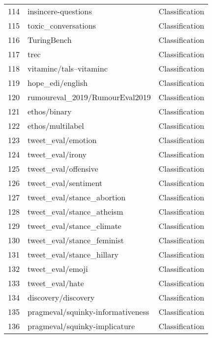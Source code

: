 \documentclass[11pt]{article}
\begin{document}
\begin{longtable}{lll}
114 & insincere-questions & Classification \\
115 & toxic\_conversations & Classification \\
116 & TuringBench \citep{huggingface:dataset} & Classification \\
117 & trec \citep{li-roth-2002-learning} & Classification \\
118 & vitaminc/tals--vitaminc \citep{schuster-etal-2021-get} & Classification \\
119 & hope\_edi/english \citep{chakravarthi-2020-hopeedi} & Classification \\
120 & rumoureval\_2019/RumourEval2019 \citep{gorrell-etal-2019-semeval} & Classification \\
121 & ethos/binary \citep{mollas2020ethos} & Classification \\
122 & ethos/multilabel \citep{mollas2020ethos} & Classification \\
123 & tweet\_eval/emotion \citep{barbieri2020tweeteval} & Classification \\
124 & tweet\_eval/irony \citep{barbieri2020tweeteval} & Classification \\
125 & tweet\_eval/offensive \citep{barbieri2020tweeteval} & Classification \\
126 & tweet\_eval/sentiment \citep{barbieri2020tweeteval} & Classification \\
127 & tweet\_eval/stance\_abortion \citep{barbieri2020tweeteval} & Classification \\
128 & tweet\_eval/stance\_atheism \citep{barbieri2020tweeteval} & Classification \\
129 & tweet\_eval/stance\_climate \citep{barbieri2020tweeteval} & Classification \\
130 & tweet\_eval/stance\_feminist \citep{barbieri2020tweeteval} & Classification \\
131 & tweet\_eval/stance\_hillary \citep{barbieri2020tweeteval} & Classification \\
132 & tweet\_eval/emoji \citep{barbieri2020tweeteval} & Classification \\
133 & tweet\_eval/hate \citep{barbieri2020tweeteval} & Classification \\
134 & discovery/discovery \citep{sileo-etal-2019-mining} & Classification \\
135 & pragmeval/squinky-informativeness \citep{DBLP:journals/corr/Lahiri15} & Classification \\
136 & pragmeval/squinky-implicature \citep{DBLP:journals/corr/Lahiri15} & Classification \\

\end{longtable}
\end{document}
